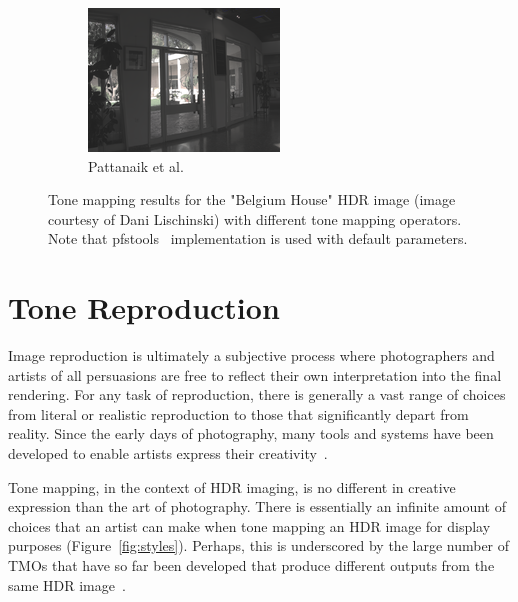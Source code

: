 \begin{figure}
\begin{subfigure}[b]{0.33\textwidth}
    \includegraphics[width=\textwidth]{figures/chapter2/tmos44/44_pattanaik00.png}
    \caption{Pattanaik et al.~\cite{pattanaik2000time}}
\end{subfigure}\hfill
\caption{Tone mapping results for the "Belgium House" HDR image (image courtesy of Dani Lischinski) with different tone mapping operators. Note that pfstools~\cite{HDRGallery} implementation is used with default parameters.}
\label{fig:tmos}
\end{figure}

\section{Tone Reproduction}
Image reproduction is ultimately a subjective process where photographers and artists of all persuasions are free to reflect their own interpretation into the final rendering. For any task of reproduction, there is generally a vast range of choices from literal or realistic reproduction to those that significantly depart from reality. Since the early days of photography, many tools and systems have been developed to enable artists express their creativity~\cite{Adams80,Adams81,Adams83,White84}.

Tone mapping, in the context of HDR imaging, is no different in creative expression than the art of photography. There is essentially an infinite amount of choices that an artist can make when tone mapping an HDR image for display purposes (Figure~\ref{fig:styles}). Perhaps, this is underscored by the large number of TMOs that have so far been developed that produce different outputs from the same HDR image~\cite{Rein2010}.

